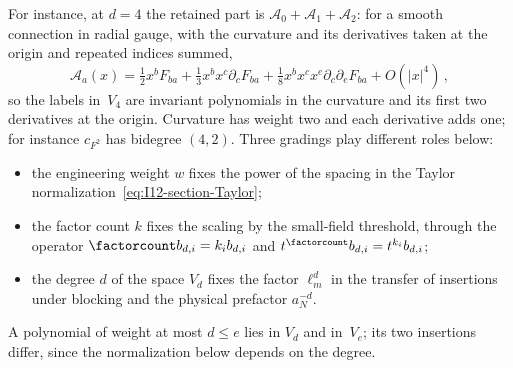 For instance, at $d=4$ the retained part is $\mathcal A_0+\mathcal A_1+\mathcal A_2$: for a smooth connection in radial gauge, with the curvature and its derivatives taken at the origin and repeated indices summed,
\begin{equation*}
\mathcal A_a(x)=\tfrac12x^bF_{ba}+\tfrac13x^bx^c\partial_cF_{ba}+\tfrac18x^bx^cx^e\partial_c\partial_eF_{ba}+O(|x|^4)\,,
\end{equation*}
so the labels in~$V_4$ are invariant polynomials in the curvature and its first two derivatives at the origin. Curvature has weight two and each derivative adds one; for instance $c_{F^2}$ has bidegree $(4,2)$. Three gradings play different roles below:
\begin{itemize}[nosep]
\item the engineering weight $w$ fixes the power of the spacing in the Taylor normalization~\eqref{eq:I12-section-Taylor};
\item the factor count $k$ fixes the scaling by the small-field threshold, through the operator $\factorcount b_{d,i}=k_ib_{d,i}$ and $t^{\factorcount}b_{d,i}=t^{k_i}b_{d,i}$;
\item the degree $d$ of the space $V_d$ fixes the factor $\ell_m^d$ in the transfer of insertions under blocking and the physical prefactor $a_N^{-d}$.
\end{itemize}
A polynomial of weight at most $d\le e$ lies in $V_d$ and in~$V_e$; its two insertions differ, since the normalization below depends on the degree.

